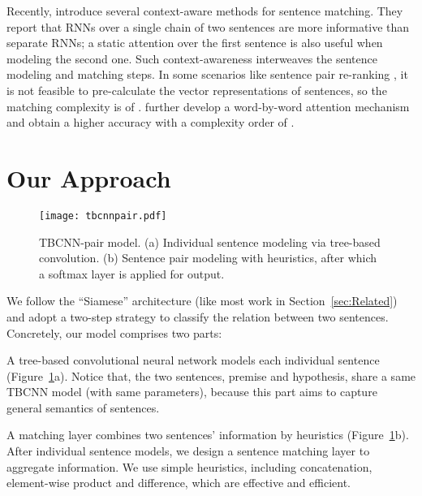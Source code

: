 \documentclass[11pt]{article}
\begin{document}
Recently,  introduce several context-aware methods for sentence matching. They report that RNNs over a single chain of two sentences are more informative than separate RNNs; a static attention over the first sentence is also useful when modeling the second one. Such context-awareness interweaves the sentence modeling and matching steps. In some scenarios like sentence pair re-ranking \cite{sigir}, it is not feasible to pre-calculate the vector representations of sentences, so the matching complexity is of .  further develop a word-by-word attention mechanism and obtain a higher accuracy with a complexity order of .
 
\vspace{-.1cm}
\section{Our Approach}\label{sec:Approach}
\vspace{-.1cm}


\begin{figure}[!t]
\centering
\texttt{[image: tbcnnpair.pdf]}
\vspace{-.8cm plus 0cm minus 0cm}
\caption{TBCNN-pair model. (a) Individual sentence modeling via tree-based convolution. (b) Sentence pair modeling with heuristics, after which a softmax layer is applied for output.}\label{fig:model}

\end{figure}
We follow the ``Siamese'' architecture (like most work in Section~\ref{sec:Related}) and adopt a two-step strategy to classify the relation between two sentences. Concretely, our model comprises two parts:

\begin{compactitem}[\ \ ]
\item A tree-based convolutional neural network models each individual sentence (Figure~\ref{fig:model}a). Notice that, the two sentences, premise and hypothesis, share a same TBCNN model (with same parameters), because this part aims to capture general semantics of sentences.

\item A matching layer combines two sentences' information by heuristics (Figure~\ref{fig:model}b). After individual sentence models, we design a sentence matching layer to aggregate information. We use simple heuristics, including concatenation, element-wise product and difference, which are effective and efficient.
\end{compactitem}
\end{document}
